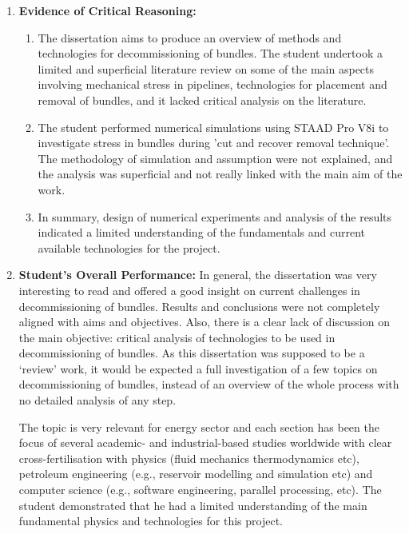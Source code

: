 \documentclass[14pt,twoside]{report}
\begin{document}
\begin{enumerate}
\begin{enumerate}
                \end{enumerate}
%
    \item {\bf Evidence of Critical Reasoning:}
                \begin{enumerate}
                   \item The dissertation aims to produce an overview of methods and technologies for decommissioning of bundles. The student undertook a limited and superficial literature review on some of the main aspects involving mechanical stress in pipelines, technologies for placement and removal of bundles, and it lacked critical analysis on the literature.  
                   \item The student performed numerical simulations using STAAD Pro V8i to investigate stress in bundles during 'cut and recover removal technique'. The methodology of simulation and assumption were not explained, and the analysis was superficial and not really linked with the main aim of the work. 
                   \item In summary, design of numerical experiments and analysis of the results indicated a limited understanding of the fundamentals and current available technologies for the project. 
                \end{enumerate}
%
    \item {\bf Student's Overall Performance:} In general, the dissertation was very interesting to read and offered a good insight on current challenges in decommissioning of bundles. Results and conclusions were not completely aligned with aims and objectives. Also, there is a clear lack of discussion on the main objective: critical analysis of technologies to be used in decommissioning of bundles. As this dissertation was supposed to be a `review' work, it would be expected a full investigation of a few topics on decommissioning of bundles, instead of an overview of the whole process with no detailed analysis of any step. 

The topic is very relevant for energy sector and each section has been the focus of several academic- and industrial-based studies worldwide with clear cross-fertilisation with physics (fluid mechanics thermodynamics etc), petroleum engineering (e.g., reservoir modelling and simulation etc) and computer science (e.g., software engineering, parallel processing, etc). The student demonstrated that he had a limited understanding of the main fundamental physics and technologies for this project.
%
\end{enumerate}
\clearpage
\end{document}
